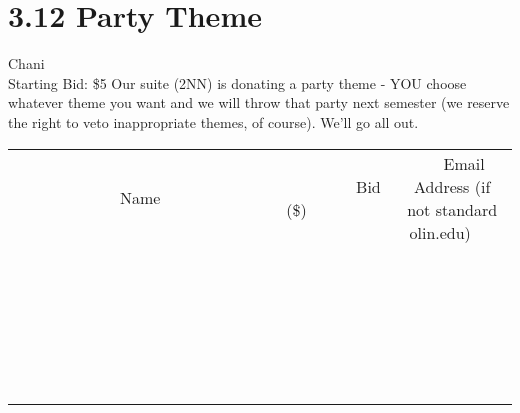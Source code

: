 \documentclass[11pt]{article}
\begin{document}
\section*{3.12 Party Theme}
Chani
\\
Starting Bid: \$5
\newline
Our suite (2NN) is donating a party theme - YOU choose whatever theme you want and we will throw that party next semester (we reserve the right to veto inappropriate themes, of course).  We'll go all out.
\\[6ex]
\begin{tabular}{c c c}
~~~~~~~~~~~~~Name~~~~~~~~~~~~~ & ~~~~~~~~~Bid (\$)~~~~~~~~~  & ~~~Email Address (if not standard olin.edu)~~~\\
 & & \\
\hline
 & & \\
\hline
 & & \\
\hline
 & & \\
\hline
 & & \\
\hline
 & & \\
\hline
 & & \\
\hline
 & & \\
\hline
 & & \\
\hline
 & & \\
\hline
 & & \\
\hline
 & & \\
\hline
 & & \\
\hline
 & & \\
\hline
 & & \\
\hline
 & & \\
\hline
 & & \\
\hline
 & & \\
\hline
 & & \\
\hline
 & & \\
\hline
 & & \\
\hline
 & & \\
\hline
 & & \\
\hline
 & & \\
\hline
 & & \\
\hline
 & & \\
\hline
\end{tabular}
\newpage
\end{document}

